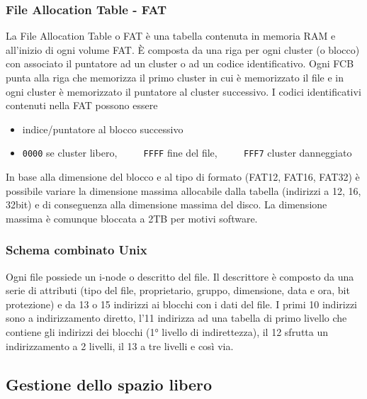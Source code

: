 \documentclass[a4paper]{article}
\begin{document}
\subsubsection*{File Allocation Table - FAT}
La File Allocation Table o FAT è una tabella contenuta in memoria RAM e all'inizio di ogni volume FAT. È composta da una riga
per ogni cluster (o blocco) con associato il puntatore ad un cluster o ad un codice identificativo. Ogni FCB punta alla riga
che memorizza il primo cluster in cui è memorizzato il file e in ogni cluster è memorizzato il puntatore al cluster successivo.
I codici identificativi contenuti nella FAT possono essere 
\begin{itemize}
	\item indice/puntatore al blocco successivo
	\item \verb|0000| se cluster libero, \(\qquad\) \verb|FFFF| fine del file, \(\qquad\) \verb|FFF7| cluster danneggiato
\end{itemize}

In base alla dimensione del blocco e al tipo di formato (FAT12, FAT16, FAT32) è possibile variare la dimensione massima allocabile
dalla tabella (indirizzi a 12, 16, 32bit) e di conseguenza alla dimensione massima del disco. La dimensione massima è comunque
bloccata a 2TB per motivi software.

\subsubsection*{Schema combinato Unix}
Ogni file possiede un i-node o descritto del file. Il descrittore è composto da una serie di attributi (tipo del file,
proprietario, gruppo, dimensione, data e ora, bit protezione) e da 13 o 15 indirizzi ai blocchi con i dati del file.
I primi 10 indirizzi sono a indirizzamento diretto, l'11 indirizza ad una tabella di primo livello che contiene gli indirizzi
dei blocchi (1° livello di indirettezza), il 12 sfrutta un indirizzamento a 2 livelli, il 13 a tre livelli e così via.


\subsection{Gestione dello spazio libero}
\end{document}
